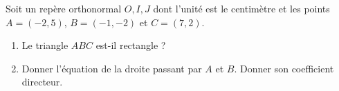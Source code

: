 
\begin{exercice}\label{exoSeconde-0019}

    Soit un repère orthonormal \( O,I,J \) dont l'unité est le centimètre et les points \( A=(-2,5)\), \( B=(-1,-2)\) et \( C=(7,2)\).
    \begin{enumerate}
        \item
            Le triangle \( ABC\) est-il rectangle ?
        \item
            Donner l'équation de la droite passant par \( A\) et \( B\). Donner son coefficient directeur.
    \end{enumerate}

\end{exercice}
